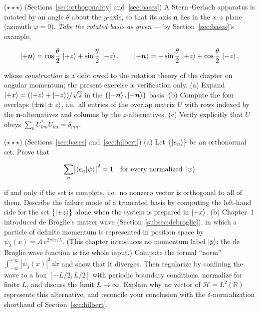 \begin{problemset}
\item ($\star\star\star$) (Sections~\ref{sec:orthogonality} and~\ref{sec:bases}) A Stern--Gerlach apparatus is rotated by an angle $\theta$ about the $y$-axis, so that its axis $\bm{n}$ lies in the $x$--$z$ plane (azimuth $\varphi=0$). \emph{Take the rotated basis as given} --- by Section~\ref{sec:bases}'s example,
\begin{linenomath}
    \begin{equation}
        \ket{+\bm{n}}=\cos\frac{\theta}{2}\,\ket{+z}+\sin\frac{\theta}{2}\,\ket{-z},
        \qquad
        \ket{-\bm{n}}=-\sin\frac{\theta}{2}\,\ket{+z}+\cos\frac{\theta}{2}\,\ket{-z},
    \end{equation}
\end{linenomath}
whose \emph{construction} is a debt owed to the rotation theory of the chapter on angular momentum; the present exercise is verification only. (a) Expand $\ket{+x}=(\ket{+z}+\ket{-z})/\sqrt{2}$ in the $\{\ket{+\bm{n}},\ket{-\bm{n}}\}$ basis. (b) Compute the four overlaps $\braket{\pm\bm{n}|\pm z}$, i.e.\ all entries of the overlap matrix $U$ with rows indexed by the $\bm{n}$-alternatives and columns by the $z$-alternatives. (c) Verify explicitly that $U$ obeys $\sum_k U^{*}_{km}U_{kn}=\delta_{mn}$.

\item ($\star\star\star$) (Sections~\ref{sec:bases} and~\ref{sec:hilbert}) (a) Let $\{\ket{e_n}\}$ be an orthonormal set. Prove that
\begin{linenomath}
    \begin{equation}
        \sum_n\bigl|\braket{e_n|\psi}\bigr|^2=1
        \quad\text{for every normalized }\ket{\psi}
    \end{equation}
\end{linenomath}
if and only if the set is complete, i.e.\ no nonzero vector is orthogonal to all of them. Describe the failure mode of a truncated basis by computing the left-hand side for the set $\{\ket{+z}\}$ alone when the system is prepared in $\ket{+x}$. (b) Chapter~1 introduced de Broglie's matter wave (Section~\ref{subsec:debroglie}), in which a particle of definite momentum is represented in position space by $\psi_\lambda(x)=A\,e^{2\pi i x/\lambda}$. (This chapter introduces no momentum label $\ket{p}$; the de Broglie wave function is the whole input.) Compute the formal ``norm'' $\int_{-\infty}^{+\infty}|\psi_\lambda(x)|^2\,\dd x$ and show that it diverges. Then regularize by confining the wave to a box $[-L/2,L/2]$ with periodic boundary conditions, normalize for finite $L$, and discuss the limit $L\to\infty$. Explain why no vector of $\mathcal{H}=L^2(\mathbb{R})$ represents this alternative, and reconcile your conclusion with the $\delta$-normalization shorthand of Section~\ref{sec:hilbert}.
\end{problemset}
